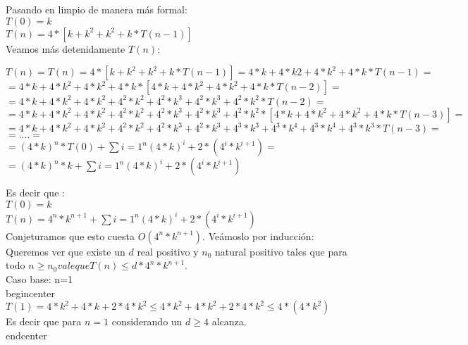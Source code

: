 \indent Pasando en limpio de manera más formal:\\
\indent $T(0)=k$\\
\indent $T(n)=4*[k + k^{2} + k^{2} + k* T(n-1)]$\\

\indent Veamos más detenidamente $T(n)$:\\
\begin{center}
\indent $T(n)= T(n)=4*[k + k^{2} + k^{2} + k* T(n-1)] = 4*k + 4*k{2} + 4*k^{2} + 4*k * T(n-1)=$ \\
\indent $= 4*k + 4*k^{2} + 4*k^{2} + 4*k *[4*k + 4*k^{2} + 4*k^{2} + 4*k * T(n-2)]=$\\
\indent $=4*k + 4*k^{2} + 4*k^{2} + 4^{2}*k^{2} + 4^{2}*k^{3} + 4^{2}*k^{3}+ 4^{2}*k^{2} * T(n-2)=$\\
\indent $=4*k + 4*k^{2} + 4*k^{2} + 4^{2}*k^{2} + 4^{2}*k^{3} + 4^{2}*k^{3}+ 4^{2}*k^{2} * [4*k + 4*k^{2} + 4*k^{2} + 4*k* T(n-3)]=$\\
\indent $=4*k + 4*k^{2} + 4*k^{2} + 4^{2}*k^{2} + 4^{2}*k^{3} + 4^{2}*k^{3}+ 4^{3}*k^{3} + 4^{3}*k^{4} + 4^{3}*k^{4} + 4^{3}*k^{3} * T(n-3)=$\\
\indent $=....=$\\
\indent $=  (4*k)^{n} * T(0) + \sum{i=1}^{n} (4*k)^{i} + 2 * (4^{i}* k^{i+1})=$ \\
\indent $=  (4*k)^{n} * k + \sum{i=1}^{n} (4*k)^{i} + 2 * (4^{i}* k^{i+1})$ \\
\end{center}


\indent Es decir que :\\

\indent $T(0)=k$\\
\indent $T(n)= 4^{n}* k^{n+1} + \sum{i=1}^{n} (4*k)^{i} + 2 * (4^{i}* k^{i+1})$\\

\indent Conjeturamos que esto cuesta $O(4^{n}*k^{n+1})$. Veámoslo por inducción:\\
\indent Queremos ver que existe un $d$ real positivo y $n_{0}$ natural positivo tales que para todo $n\geq n_{0} vale que T(n) \leq d * 4^{n}*k^{n+1}$.\\
\indent Caso base: n=1 \\

begin{center}
\indent  $T(1)=4* k^{2} + 4*k + 2 * 4* k^{2} \leq 4* k^{2} + 4*k^{2} + 2 * 4* k^{2} \leq 4* (4*k^2)$\\
\indent Es decir que para $n=1$ considerando un $d \geq 4 $ alcanza.\\
end{center}

